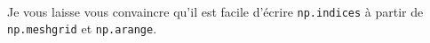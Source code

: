     \begin{center}
    \end{center}
    { \hspace*{\fill} \\}
    
    Je vous laisse vous convaincre qu'il est facile d'écrire
\texttt{np.indices} à partir de \texttt{np.meshgrid} et
\texttt{np.arange}.


    
    
    

